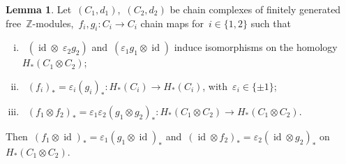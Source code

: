 \documentclass{amsart}
\theoremstyle{definition}
\theoremstyle{definition}
\theoremstyle{definition}
\theoremstyle{definition}
\newtheorem{lemma}[theorem]{Lemma}
\DeclareMathOperator{\id}{id}
\newcommand{\Z}{\mathbb{Z}}
\begin{document}
 \begin{lemma}\label{lem:kunneth}
Let~$(C_1,d_1)$,~$(C_2,d_2)$ be chain complexes of finitely generated free~$\Z$-modules,~$f_i, g_i:C_i\rightarrow C_i$ chain maps for~$i\in\{1,2\}$ such that 
\begin{enumerate}[(i)]
    \item~$(\id \otimes \; \varepsilon_2 g_2)$ and~$(\varepsilon_1 g_1 \otimes \id)$ induce isomorphisms on the homology~$H_\ast(C_1 \otimes C_2)$; \label{enumitem:kunneth hyp 1}
    \item~$(f_i)_* = \varepsilon_i (g_i)_* \colon H_*(C_i)\rightarrow H_*(C_i)$, with~$\varepsilon_i \in \{\pm 1\}$; \label{enumitem:kunneth hyp 2}
    \item~$(f_1\otimes f_2)_* = \varepsilon_1\varepsilon_2 (g_1\otimes g_2)_* \colon H_*(C_1\otimes C_2) \rightarrow H_*(C_1\otimes C_2)$. \label{enumitem:kunneth hyp 3}
\end{enumerate}

Then~$(f_1\otimes \id)_* = \varepsilon_1 (g_1\otimes \id)_*$ and~$(\id\otimes f_2)_* = \varepsilon_2 (\id\otimes g_2)_*$ on~$H_*(C_1\otimes C_2)$.
     
 \end{lemma}
\end{document}
